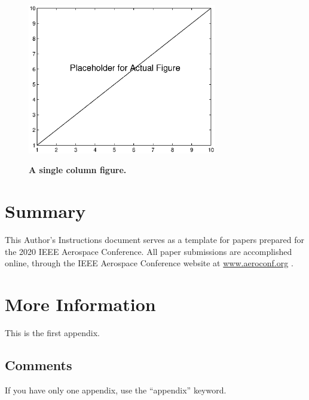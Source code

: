 \documentclass[twocolumn,letterpaper]{IEEEAerospaceCLS}  %
\begin{document}
\begin{figure}\label{OneColumn}
\centering
\includegraphics[width=3.25in]{placeholder.eps}\\
\caption{\textbf{ A single column figure.}}
\end{figure}


\section{Summary}
This Author's Instructions document serves as a template for papers prepared for the 2020 IEEE Aerospace Conference. All paper submissions are accomplished online, through the IEEE Aerospace Conference website at \underline {www.aeroconf.org} \cite{AeroConf}.





\appendices{}              %

\section{More Information}        %
This is the first appendix. 

\subsection{Comments}
If you have only one appendix, use the ``appendix'' keyword.
\end{document}
